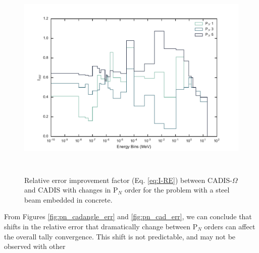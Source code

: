 \begin{figure}[h!]
  \centering
  \includegraphics[height=10cm]{./chapters/characterization_probs/figures/angle/prob_1/compare_err_pN.pdf}
  \caption[Relative error improvement factor (Eq. \eqref{eq:I-RE}) between CADIS-$\Omega$ and
  CADIS with changes in P$_N$ order for steel beam embedded in concrete.]
  {Relative error improvement factor (Eq. \eqref{eq:I-RE}) between CADIS-$\Omega$ and
   CADIS with changes in P$_N$ order for the problem with a
   steel beam embedded in concrete.}
  \label{fig:prob_1_pN_I_RE}
\end{figure}

From Figures \ref{fig:pn_cadangle_err} and \ref{fig:pn_cad_err}, we can conclude
that shifts in the relative error that dramatically change between P$_N$ orders
can affect the overall tally convergence. This shift is not predictable, and may
not be observed with other

